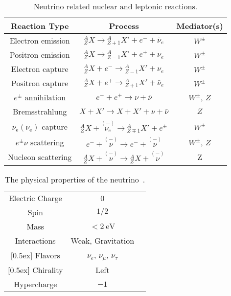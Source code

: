 \begin{table}[ht]
\centering
\setlength\tabcolsep{10pt}
 \begin{tabular}{ c  c  c}
 \hline
 \hline
 Reaction Type & Process & Mediator(s)   \\
 \hline
 Electron emission & ${}^A_Z X \to {}^A_{Z+1}X' + e^- +\bar \nu_e$ & $W^{\pm}$  \\
 Positron emission & ${}^A_Z X \to {}^A_{Z-1}X' + e^+ + \nu_e$ & $W^{\pm}$  \\
 Electron capture & ${}^A_Z X + e^- \to {}^A_{Z-1}X'  + \nu_e$ &  $W^{\pm}$ \\
 Positron capture & ${}^A_Z X + e^+ \to {}^A_{Z+1}X'  + \bar\nu_e$ &  $W^{\pm}$ \\
 [0.5ex]
 \hline

 $e^{\pm}$ annihilation &  $e^- + e^+  \to \nu + \bar\nu $  & $W^{\pm}$, $Z$ \\
 Bremsstrahlung & $X+X' \to X + X' + \nu + \bar\nu$ & $Z$ \\
 [0.5ex]
 \hline

  $\nu_{\mathrm e} (\bar\nu_{\mathrm e})$ capture & ${}^A_{Z}X + \overset{(-)}{\nu_e} \to {}^A_{Z\mp 1}X' + e^\pm $ & $W^{\pm}$\\
  [1ex]
 \hline
 $e^\pm\nu$ scattering & $e^- + \overset{(-)}{\nu} \to e^- + \overset{(-)}{\nu} $ &  $W^{\pm}$, $Z$ \\
 Nucleon scattering & $ {}^A_Z X + \overset{(-)}{\nu} \to {}^A_Z X + \overset{(-)}{\nu} $ &  Z\\
 [0.5ex]
 \hline
 \hline
 \end{tabular}
 \caption{Neutrino related nuclear and leptonic reactions.}
\label{table:Neutrino_Reactions}
\end{table}

\begin{table}[ht]
\centering
\setlength\tabcolsep{15pt}
 \begin{tabular}{ c  c  c}
 \hline
 \hline
  Electric Charge & 0\\
 [0.5ex]
  Spin & $1/2$ \\
 [0.5ex]
 Mass & $<2~\mathrm{eV}$ \\
 [0.5ex]
 Interactions & Weak, Gravitation  \\
 [0.5ex]
 Flavors & $\nu_e$, $\nu_\mu$, $\nu_\tau$ \\
 [0.5ex]
 Chirality & Left \\
 [0.5ex]
 Hypercharge & $-1$ \\
 [0.5ex]
 \hline
 \hline
 \end{tabular}
 \caption{The physical properties of the neutrino~\cite{Patrignani:2016xqp}.}
\label{table:neutrino-properties}
\end{table}

